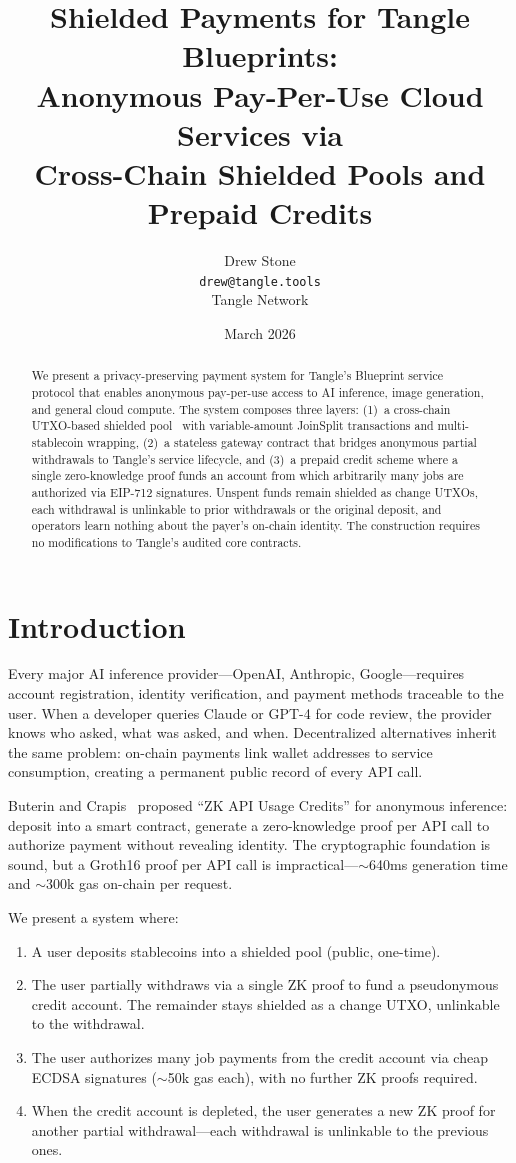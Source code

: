 \documentclass[11pt,a4paper]{article}
\title{Shielded Payments for Tangle Blueprints:\\
Anonymous Pay-Per-Use Cloud Services via\\Cross-Chain Shielded Pools and Prepaid Credits}
\author{
  Drew Stone\\
  \texttt{drew@tangle.tools}\\
  Tangle Network
}
\date{March 2026}
\theoremstyle{definition}
\begin{document}
\maketitle

\begin{abstract}
We present a privacy-preserving payment system for Tangle's Blueprint service protocol that enables anonymous pay-per-use access to AI inference, image generation, and general cloud compute. The system composes three layers: (1)~a cross-chain UTXO-based shielded pool~\cite{webb} with variable-amount JoinSplit transactions and multi-stablecoin wrapping, (2)~a stateless gateway contract that bridges anonymous partial withdrawals to Tangle's service lifecycle, and (3)~a prepaid credit scheme where a single zero-knowledge proof funds an account from which arbitrarily many jobs are authorized via EIP-712 signatures. Unspent funds remain shielded as change UTXOs, each withdrawal is unlinkable to prior withdrawals or the original deposit, and operators learn nothing about the payer's on-chain identity. The construction requires no modifications to Tangle's audited core contracts.
\end{abstract}

\section{Introduction}

Every major AI inference provider---OpenAI, Anthropic, Google---requires account registration, identity verification, and payment methods traceable to the user. When a developer queries Claude or GPT-4 for code review, the provider knows who asked, what was asked, and when. Decentralized alternatives inherit the same problem: on-chain payments link wallet addresses to service consumption, creating a permanent public record of every API call.

Buterin and Crapis~\cite{zkapi} proposed ``ZK API Usage Credits'' for anonymous inference: deposit into a smart contract, generate a zero-knowledge proof per API call to authorize payment without revealing identity. The cryptographic foundation is sound, but a Groth16 proof per API call is impractical---$\sim$640ms generation time and $\sim$300k gas on-chain per request.

We present a system where:
\begin{enumerate}[nosep]
  \item A user deposits stablecoins into a shielded pool (public, one-time).
  \item The user partially withdraws via a single ZK proof to fund a pseudonymous credit account. The remainder stays shielded as a change UTXO, unlinkable to the withdrawal.
  \item The user authorizes many job payments from the credit account via cheap ECDSA signatures ($\sim$50k gas each), with no further ZK proofs required.
  \item When the credit account is depleted, the user generates a new ZK proof for another partial withdrawal---each withdrawal is unlinkable to the previous ones.
\end{enumerate}
\end{document}

